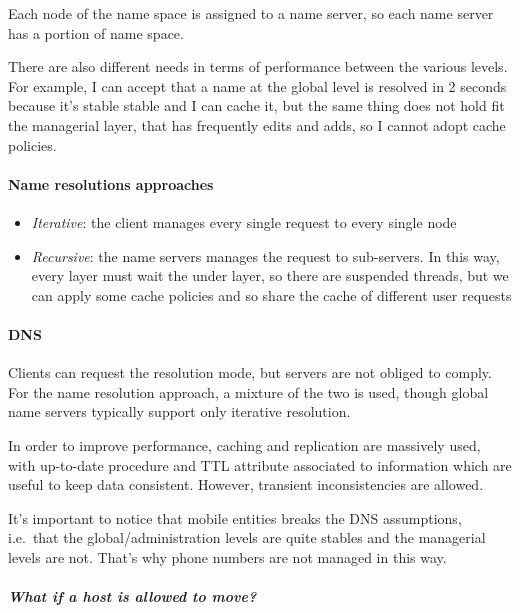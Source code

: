 Each node of the name space is assigned to a name server, so each name
server has a portion of name space.

There are also different needs in terms of performance between the
various levels. For example, I can accept that a name at the global
level is resolved in 2 seconds because it's stable stable and I can
cache it, but the same thing does not hold fit the managerial layer,
that has frequently edits and adds, so I cannot adopt cache policies.

\paragraph{Name resolutions approaches}

\begin{itemize}
    \item
        \textit{Iterative}: the client manages every single request to every single
        node
    \item
        \textit{Recursive}: the name servers manages the request to sub-servers. In
          this way, every layer must wait the under layer, so there are
          suspended threads, but we can apply some cache policies and so share
          the cache of different user requests
\end{itemize}

\paragraph{DNS}

Clients can request the resolution mode, but servers are not obliged to
comply. For the name resolution approach, a mixture of the two is used,
though global name servers typically support only iterative resolution.

In order to improve performance, caching and replication are massively
used, with up-to-date procedure and TTL attribute associated to
information which are useful to keep data consistent. However, transient
inconsistencies are allowed.

It's important to notice that mobile entities breaks the DNS
assumptions, i.e.~that the global/administration levels are quite
stables and the managerial levels are not. That's why phone numbers are
not managed in this way.

\subparagraph{What if a host is allowed to move?}

